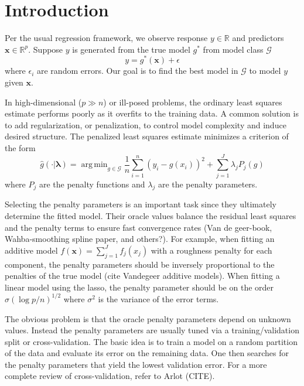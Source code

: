 \documentclass[12pt]{article}
\DeclareMathOperator*{\argmin}{arg\,min}
\begin{document}
\section{Introduction}

Per the usual regression framework, we observe response $y \in \mathbb{R}$ and predictors $\boldsymbol {x} \in \mathbb{R}^p$. Suppose $y$ is generated from the true model $g^*$ from model class $\mathcal{G}$
\begin{equation}
y = g^*(\boldsymbol x) + \epsilon
\end{equation}
where $\epsilon_i$ are random errors. Our goal is to find the best model in $\mathcal{G}$ to model $y$ given $\boldsymbol x$.

In high-dimensional ($p \gg n$) or ill-posed problems, the ordinary least squares estimate performs poorly as it overfits to the training data. A common solution is to add regularization, or penalization, to control model complexity and induce desired structure. The penalized least squares estimate minimizes a criterion of the form
\begin{equation}
\label{intro_train_criterion}
\hat{g}(\cdot | \boldsymbol \lambda) = \argmin_{g\in \mathcal{G}} \frac{1}{n} \sum_{i=1}^n \left (y_i -  g(x_i) \right )^2 + \sum_{j=1}^J \lambda_j P_j(g)
\end{equation}
where $P_j$ are the penalty functions and $\lambda_j$ are the penalty parameters.

Selecting the penalty parameters is an important task since they ultimately determine the fitted model. Their oracle values balance the residual least squares and the penalty terms to ensure fast convergence rates (Van de geer-book, Wahba-smoothing spline paper, and others?). For example, when fitting an additive model $f(\boldsymbol x) = \sum_{j=1}^J f_j(x_j)$ with a roughness penalty for each component, the penalty parameters should be inversely proportional to the penalties of the true model (cite Vandegeer additive models). When fitting a linear model using the lasso, the penalty parameter should be on the order $\sigma (\log p /n )^{1/2}$ where $\sigma^2$ is the variance of the error terms.

The obvious problem is that the oracle penalty parameters depend on unknown values. Instead the penalty parameters are usually tuned via a training/validation split or cross-validation. The basic idea is to train a model on a random partition of the data and evaluate its error on the remaining data. One then searches for the penalty parameters that yield the lowest validation error. For a more complete review of cross-validation, refer to Arlot (CITE).
\end{document}
